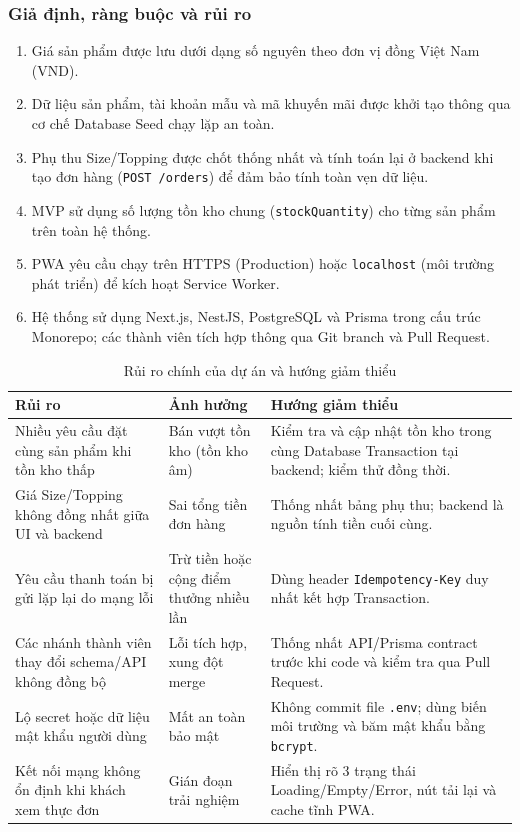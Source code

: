 \subsubsection{Giả định, ràng buộc và rủi ro}
\begin{enumerate}
    \item Giá sản phẩm được lưu dưới dạng số nguyên theo đơn vị đồng Việt Nam (VND).
    \item Dữ liệu sản phẩm, tài khoản mẫu và mã khuyến mãi được khởi tạo thông qua cơ chế Database Seed chạy lặp an toàn.
    \item Phụ thu Size/Topping được chốt thống nhất và tính toán lại ở backend khi tạo đơn hàng (\texttt{POST /orders}) để đảm bảo tính toàn vẹn dữ liệu.
    \item MVP sử dụng số lượng tồn kho chung (\texttt{stockQuantity}) cho từng sản phẩm trên toàn hệ thống.
    \item PWA yêu cầu chạy trên HTTPS (Production) hoặc \texttt{localhost} (môi trường phát triển) để kích hoạt Service Worker.
    \item Hệ thống sử dụng Next.js, NestJS, PostgreSQL và Prisma trong cấu trúc Monorepo; các thành viên tích hợp thông qua Git branch và Pull Request.
\end{enumerate}

\begin{table}[H]
\centering
\small
\renewcommand{\arraystretch}{1.25}
\caption{Rủi ro chính của dự án và hướng giảm thiểu}
\begin{tabularx}{\textwidth}{|p{}|p{}|X|}
\hline
\textbf{Rủi ro} & \textbf{Ảnh hưởng} & \textbf{Hướng giảm thiểu} \\
\hline
Nhiều yêu cầu đặt cùng sản phẩm khi tồn kho thấp & Bán vượt tồn kho (tồn kho âm) & Kiểm tra và cập nhật tồn kho trong cùng Database Transaction tại backend; kiểm thử đồng thời. \\
\hline
Giá Size/Topping không đồng nhất giữa UI và backend & Sai tổng tiền đơn hàng & Thống nhất bảng phụ thu; backend là nguồn tính tiền cuối cùng. \\
\hline
Yêu cầu thanh toán bị gửi lặp lại do mạng lỗi & Trừ tiền hoặc cộng điểm thưởng nhiều lần & Dùng header \texttt{Idempotency-Key} duy nhất kết hợp Transaction. \\
\hline
Các nhánh thành viên thay đổi schema/API không đồng bộ & Lỗi tích hợp, xung đột merge & Thống nhất API/Prisma contract trước khi code và kiểm tra qua Pull Request. \\
\hline
Lộ secret hoặc dữ liệu mật khẩu người dùng & Mất an toàn bảo mật & Không commit file \texttt{.env}; dùng biến môi trường và băm mật khẩu bằng \texttt{bcrypt}. \\
\hline
Kết nối mạng không ổn định khi khách xem thực đơn & Gián đoạn trải nghiệm & Hiển thị rõ 3 trạng thái Loading/Empty/Error, nút tải lại và cache tĩnh PWA. \\
\hline
\end{tabularx}
\end{table}

